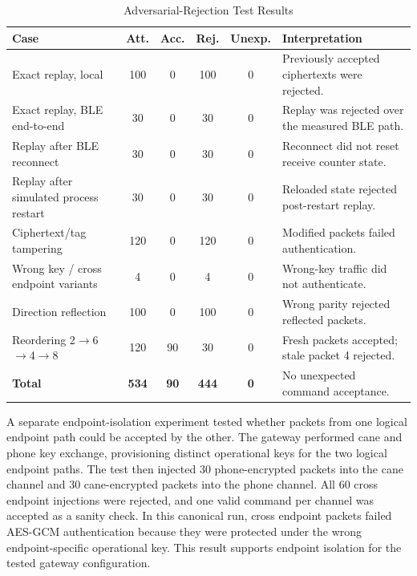\documentclass[journal]{IEEEtran}
\begin{document}
\begin{table}[!t]
\renewcommand{\arraystretch}{1.15}
\setlength{\tabcolsep}{3pt} %
\caption{Adversarial-Rejection Test Results}
\label{tab:adversarial}
\centering
\scriptsize
\begin{tabular}{>{\raggedright\arraybackslash}p{2.4cm} c c c c >{\raggedright\arraybackslash}p{2.6cm}}
\toprule
\textbf{Case} & \textbf{Att.} & \textbf{Acc.} & \textbf{Rej.} & \textbf{Unexp.} & \textbf{Interpretation} \\
\midrule
Exact replay, local & 100 & 0 & 100 & 0 & Previously accepted ciphertexts were rejected. \\
Exact replay, BLE end-to-end & 30 & 0 & 30 & 0 & Replay was rejected over the measured BLE path. \\
Replay after BLE reconnect & 30 & 0 & 30 & 0 & Reconnect did not reset receive counter state. \\
Replay after simulated process restart & 30 & 0 & 30 & 0 & Reloaded state rejected post-restart replay. \\
Ciphertext/tag tampering & 120 & 0 & 120 & 0 & Modified packets failed authentication. \\
Wrong key / cross endpoint variants & 4 & 0 & 4 & 0 & Wrong-key traffic did not authenticate. \\
Direction reflection & 100 & 0 & 100 & 0 & Wrong parity rejected reflected packets. \\
Reordering 2$\rightarrow$6$\rightarrow$4$\rightarrow$8 & 120 & 90 & 30 & 0 & Fresh packets accepted; stale packet 4 rejected. \\
\midrule
\textbf{Total} & \textbf{534} & \textbf{90} & \textbf{444} & \textbf{0} & No unexpected command acceptance. \\
\bottomrule
\end{tabular}
\end{table}

A separate endpoint-isolation experiment tested whether packets from one logical endpoint path could be accepted by the other. The gateway performed cane and phone key exchange, provisioning distinct operational keys for the two logical endpoint paths. The test then injected 30 phone-encrypted packets into the cane channel and 30 cane-encrypted packets into the phone channel. All 60 cross endpoint injections were rejected, and one valid command per channel was accepted as a sanity check. In this canonical run, cross endpoint packets failed AES-GCM authentication because they were protected under the wrong endpoint-specific operational key. This result supports endpoint isolation for the tested gateway configuration.
\end{document}
